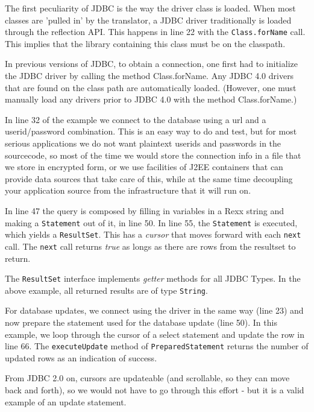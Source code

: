 The first peculiarity of JDBC is the way the driver class is
loaded. When most classes are 'pulled in' by the translator, a JDBC
driver traditionally is loaded through the reflection API. This
happens in line 22 with the \texttt{Class.forName} call. This implies
that the library containing this class must be on the classpath.

\begin{shaded}\noindent
In previous versions of JDBC, to obtain a connection, one first had to
initialize the JDBC driver by calling the method Class.forName. Any
JDBC 4.0 drivers that are found on the class path are automatically
loaded. (However, one must manually load any drivers prior to JDBC 4.0
with the method Class.forName.)
\end{shaded}\indent

In line 32 of the example we connect to the database using a url and a
userid/password combination. This is an easy way to do and test, but
for most serious applications we do not want plaintext userids and
passwords in the sourcecode, so most of the time we would store the
connection info in a file that we store in encrypted form, or we use
facilities of J2EE containers that can provide data sources that take
care of this, while at the same time decoupling your application
source from the infrastructure that it will run on.

In line 47 the query is composed by filling in variables in a Rexx
string and making a \texttt{Statement} out of it, in line 50. In line
  55, the \texttt{Statement} is executed, which yields a
  \texttt{ResultSet}. This has a \emph{cursor} that moves forward with
  each \texttt{next} call. The \texttt{next} call returns \emph{true}
  as longs as there are rows from the resultset to return.

The \texttt{ResultSet} interface implements \emph{getter} methods for
  all JDBC Types. In the above example, all returned results are of
  type \texttt{String}.

 
For database updates, we connect using the driver in the same way
(line 23) and now prepare the statement used for the database update
(line 50). In this example, we loop through the cursor of a select
statement and update the row in line 66. The \texttt{executeUpdate}
method of \texttt{PreparedStatement} returns the number of updated
rows as an indication of success.

From JDBC 2.0 on, cursors are updateable (and scrollable, so they can
move back and forth), so we would not have to go
through this effort - but it is a valid example of an update statement.
